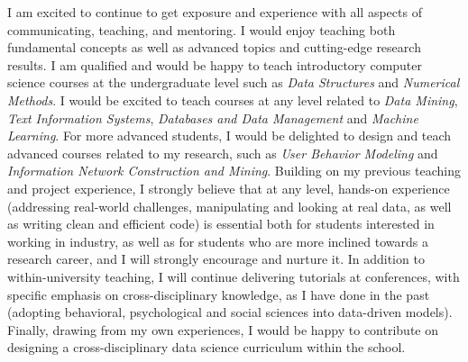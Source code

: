 \documentclass[10.5pt]{article}
\begin{document}
\vskip 0.12in
\vskip 0.02in

I am excited to continue to get exposure and experience with all aspects of communicating, teaching, and mentoring. I would enjoy teaching both fundamental concepts as well as advanced topics and cutting-edge research results. I am qualified and would be happy to teach introductory computer science courses at the undergraduate level such as \emph{Data Structures} and \emph{Numerical Methods}. I would be excited to teach courses at any level related to \emph{Data Mining}, \emph{Text Information Systems}, \emph{Databases and Data Management} and \emph{Machine Learning}. For more advanced students, I would be delighted to design and teach advanced courses related to my research, such as \emph{User Behavior Modeling} and \emph{Information Network Construction and Mining}. Building on my previous teaching and project experience, I strongly believe that at any level, hands-on experience (addressing real-world challenges, manipulating and looking at real data, as well as writing clean and efficient code) is essential both for students interested in working in industry, as well as for students who are more inclined towards a research career, and I will strongly encourage and nurture it. In addition to within-university teaching, I will continue delivering tutorials at conferences, with specific emphasis on cross-disciplinary knowledge, as I have done in the past (adopting behavioral, psychological and social sciences into data-driven models). Finally, drawing from my own experiences, I would be happy to contribute on designing a cross-disciplinary data science curriculum within the school.

\vspace{-0.1in}


\end{document}
